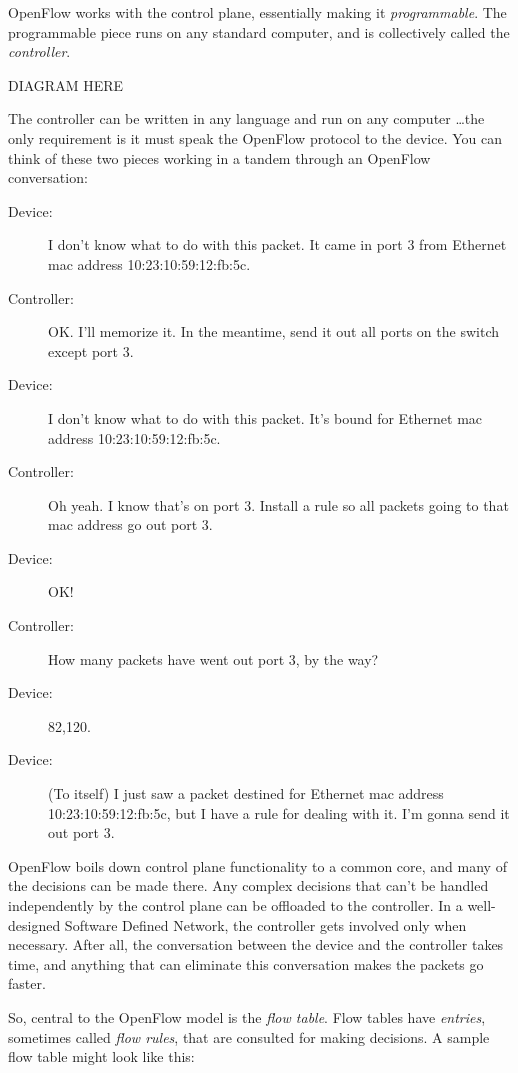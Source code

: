OpenFlow works with the control plane, essentially making it \textit{programmable}.  
The programmable piece runs on any standard computer, and is collectively called the \textit{controller}.  

DIAGRAM HERE

The controller can be written in any language and run on any computer \ldots the only requirement is it must speak the
OpenFlow protocol to the device.  
You can think of these two pieces working in a tandem through an OpenFlow conversation:

\begin{description}
\item[Device:] I don't know what to do with this packet.  It came in port 3 from Ethernet mac address 10:23:10:59:12:fb:5c.
\item[Controller:] OK.  I'll memorize it.  In the meantime, send it out all ports on the switch except port 3.  
\item[Device:] I don't know what to do with this packet.  It's bound for Ethernet mac address 10:23:10:59:12:fb:5c.
\item[Controller:]  Oh yeah.  I know that's on port 3.  Install a rule so all packets going to that mac address go out port 3.
\item[Device:] OK!
\item[Controller:] How many packets have went out port 3, by the way?
\item[Device:] 82,120.
\item[Device:] (To itself) I just saw a packet destined for Ethernet mac address 10:23:10:59:12:fb:5c, but I have a rule for dealing with it.  I'm gonna send it out port 3.  
\end{description}

OpenFlow boils down control plane functionality to a common core, and many of the decisions can be made there.
Any complex decisions that can't be handled independently by the control plane can be offloaded to the controller.  
In a well-designed Software Defined Network, the controller gets involved only when necessary.
After all, the conversation between the device and the controller takes time, and anything that can 
eliminate this conversation makes the packets go faster.

So, central to the OpenFlow model is the \textit{flow table}.  
Flow tables have \textit{entries}, sometimes called \textit{flow rules}, that are consulted for making decisions.
A sample flow table might look like this:

